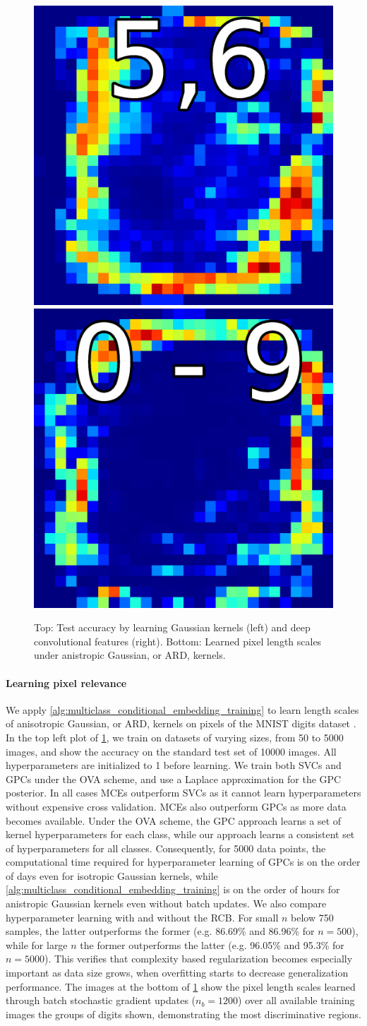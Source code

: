 \documentclass{llncs}
\begin{document}
\begin{figure}[t]
		\includegraphics[width=0.1\linewidth]{figures/pixel_relevance_56_batch_1200.eps}
		\includegraphics[width=0.1\linewidth]{figures/pixel_relevance_0123456789_batch_1200.eps}
		\caption{Top: Test accuracy by learning Gaussian kernels (left) and deep convolutional features (right). Bottom: Learned pixel length scales under anistropic Gaussian, or \gls{ARD}, kernels.}
		\label{fig:mnist_experiments}
	\end{figure}
	
	\paragraph{Learning pixel relevance}
	
	We apply \cref{alg:multiclass_conditional_embedding_training} to learn length scales of anisotropic Gaussian, or \gls{ARD}, kernels on pixels of the MNIST digits dataset \citep{lecun1998gradient}. In the top left plot of \cref{fig:mnist_experiments}, we train on datasets of varying sizes, from 50 to 5000 images, and show the accuracy on the standard test set of 10000 images. All hyperparameters are initialized to 1 before learning. We train both \glspl{SVC} and \glspl{GPC} under the \gls{OVA} scheme, and use a Laplace approximation for the \gls{GPC} posterior. In all cases \glspl{MCE} outperform \glspl{SVC} as it cannot learn hyperparameters without expensive cross validation. \glspl{MCE} also outperform \glspl{GPC} as more data becomes available. Under the \gls{OVA} scheme, the \gls{GPC} approach learns a set of kernel hyperparameters for each class, while our approach learns a consistent set of hyperparameters for all classes. Consequently, for 5000 data points, the computational time required for hyperparameter learning of \glspl{GPC} is on the order of days even for isotropic Gaussian kernels, while \cref{alg:multiclass_conditional_embedding_training} is on the order of hours for anistropic Gaussian kernels even without batch updates. We also compare hyperparameter learning with and without the \gls{RCB}. For small $n$ below 750 samples, the latter outperforms the former (e.g. 86.69\% and 86.96\% for $n = 500$), while for large $n$ the former outperforms the latter (e.g. 96.05\% and 95.3\% for $n= 5000$). This verifies that complexity based regularization becomes especially important as data size grows, when overfitting starts to decrease generalization performance. The images at the bottom of \cref{fig:mnist_experiments} show the pixel length scales learned through batch stochastic gradient updates ($n_{b} = 1200$) over all available training images the groups of digits shown, demonstrating the most discriminative regions. %
	
\end{document}
